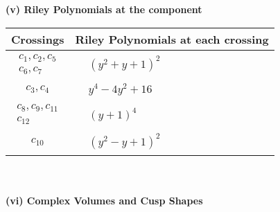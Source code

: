 \documentclass[1p]{elsarticle_modified}
\theoremstyle{definition}
\begin{document}
\newpage\renewcommand{\arraystretch}{1}
\flushleft \textbf{(v) Riley Polynomials at the component}\newline \\
\begin{tabular}{m{50pt}|m{274pt}}
Crossings & \hspace{64pt}Riley Polynomials at each crossing \\
\hline $$\begin{aligned}c_{1},c_{2},c_{5}\\c_{6},c_{7}\end{aligned}$$&$\begin{aligned}
&(y^2+y+1)^2
\end{aligned}$\\
\hline $$\begin{aligned}c_{3},c_{4}\end{aligned}$$&$\begin{aligned}
&y^4-4 y^2+16
\end{aligned}$\\
\hline $$\begin{aligned}c_{8},c_{9},c_{11}\\c_{12}\end{aligned}$$&$\begin{aligned}
&(y+1)^4
\end{aligned}$\\
\hline $$\begin{aligned}c_{10}\end{aligned}$$&$\begin{aligned}
&(y^2- y+1)^2
\end{aligned}$\\
\hline
\end{tabular}\\~\\
\newpage\flushleft \textbf{(vi) Complex Volumes and Cusp Shapes}
\end{document}

